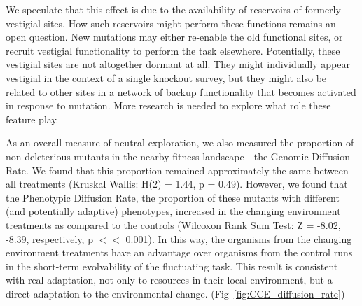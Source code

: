 \documentclass[PhD]{msu-thesis}
\begin{document}
We speculate that this effect is due to the availability of reservoirs of formerly vestigial sites. How such reservoirs might perform these functions remains an open question. New mutations may either re-enable the old functional sites, or recruit vestigial functionality to perform the task elsewhere. Potentially, these vestigial sites are not altogether dormant at all. They might individually appear vestigial in the context of a single knockout survey, but they might also be related to other sites in a network of backup functionality that becomes activated in response to mutation. More research is needed to explore what role these feature play. 






As an overall measure of neutral exploration, we also measured the proportion of non-deleterious mutants in the nearby fitness landscape - the Genomic Diffusion Rate. We found that this proportion remained approximately the same between all treatments (Kruskal Wallis: H(2) = 1.44, p = 0.49). However, we found that the Phenotypic Diffusion Rate, the proportion of these mutants with different (and potentially adaptive) phenotypes, increased in the changing environment treatments as compared to the controls (Wilcoxon Rank Sum Test: Z = -8.02, -8.39, respectively, p $<<$ 0.001). In this way, the organisms from the changing environment treatments have an advantage over organisms from the control runs in the short-term evolvability of the fluctuating task. This result is consistent with real adaptation, not only to resources in their local environment, but a direct adaptation to the environmental change. (Fig~\ref{fig:CCE_diffusion_rate})
\end{document}

